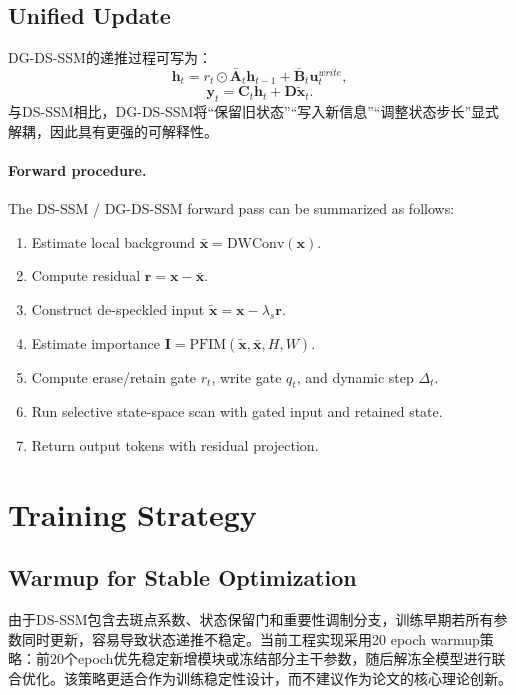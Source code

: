 \documentclass[UTF8,zihao=-4]{ctexart}
\begin{document}
\subsection{Unified Update}

DG-DS-SSM的递推过程可写为：
\begin{equation}
  \mathbf{h}_t = r_t \odot \bar{\mathbf{A}}_t \mathbf{h}_{t-1}
  + \bar{\mathbf{B}}_t \mathbf{u}^{write}_t,
\end{equation}
\begin{equation}
  \mathbf{y}_t = \mathbf{C}_t \mathbf{h}_t + \mathbf{D}\widetilde{\mathbf{x}}_t.
\end{equation}
与DS-SSM相比，DG-DS-SSM将“保留旧状态”“写入新信息”“调整状态步长”显式解耦，因此具有更强的可解释性。

\paragraph{Forward procedure.}
The DS-SSM / DG-DS-SSM forward pass can be summarized as follows:
\begin{enumerate}
  \item Estimate local background $\bar{\mathbf{x}}=\mathrm{DWConv}(\mathbf{x})$.
  \item Compute residual $\mathbf{r}=\mathbf{x}-\bar{\mathbf{x}}$.
  \item Construct de-speckled input $\widetilde{\mathbf{x}}=\mathbf{x}-\lambda_s\mathbf{r}$.
  \item Estimate importance $\mathbf{I}=\mathrm{PFIM}(\widetilde{\mathbf{x}},\bar{\mathbf{x}},H,W)$.
  \item Compute erase/retain gate $r_t$, write gate $q_t$, and dynamic step $\Delta_t$.
  \item Run selective state-space scan with gated input and retained state.
  \item Return output tokens with residual projection.
\end{enumerate}

\section{Training Strategy}

\subsection{Warmup for Stable Optimization}

由于DS-SSM包含去斑点系数、状态保留门和重要性调制分支，训练早期若所有参数同时更新，容易导致状态递推不稳定。当前工程实现采用20 epoch warmup策略：前20个epoch优先稳定新增模块或冻结部分主干参数，随后解冻全模型进行联合优化。该策略更适合作为训练稳定性设计，而不建议作为论文的核心理论创新。
\end{document}
